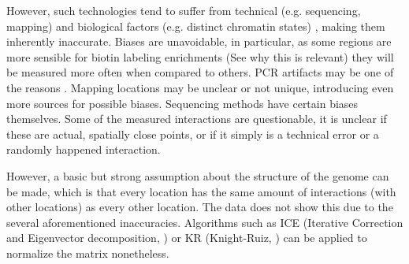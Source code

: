 However, such technologies tend to suffer from technical (e.g. sequencing,
mapping) \cite{pmid21646344} and biological factors (e.g. distinct chromatin
states) \cite{pmid19693276}, making them inherently inaccurate.  Biases are
unavoidable, in particular, as some regions are more sensible for biotin
labeling enrichments (See  why this is relevant) they will be
measured more often when compared to others. PCR artifacts may be one of the
reasons \cite{winget2015hicup}. Mapping locations may be unclear or not unique,
introducing even more sources for possible biases. Sequencing methods
have certain biases themselves. Some of the measured interactions are
questionable, it is unclear if these are actual, spatially close points, or if
it simply is a technical error or a randomly happened interaction.


However, a basic but strong assumption about the structure of the genome can be
made, which is that every location has the same amount of interactions (with
other locations) as every other location. The data does not show this due to
the several aforementioned inaccuracies. Algorithms such as ICE
\cite{imakaev2012iterative} (Iterative Correction and Eigenvector
decomposition, ) or KR \cite{knight2013fast} (Knight-Ruiz,
) can be applied to normalize the matrix nonetheless.



